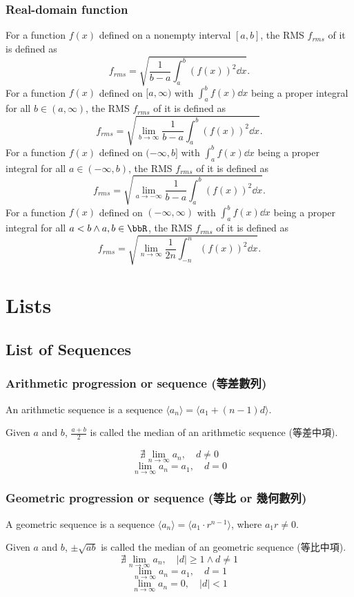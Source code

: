 \documentclass[a4paper,12pt]{report}
\begin{document}
\begin{itemize}
\begin{itemize}
\subsubsection{Real-domain function}
For a function $f(x)$ defined on a nonempty interval $[a,b]$, the RMS $f_{rms}$ of it is defined as
\[f_{rms}=\sqrt{\frac{1}{b-a}\int_a^b(f(x))^2\dd{x}}.\]
For a function $f(x)$ defined on $[a,\infty)$ with $\int_a^bf(x)\dd{x}$ being a proper integral for all $b\in(a,\infty)$, the RMS $f_{rms}$ of it is defined as
\[f_{rms}=\sqrt{\lim_{b\to\infty}\frac{1}{b-a}\int_a^b(f(x))^2\dd{x}}.\]
For a function $f(x)$ defined on $(-\infty,b]$ with $\int_a^bf(x)\dd{x}$ being a proper integral for all $a\in(-\infty,b)$, the RMS $f_{rms}$ of it is defined as
\[f_{rms}=\sqrt{\lim_{a\to-\infty}\frac{1}{b-a}\int_a^b(f(x))^2\dd{x}}.\]
For a function $f(x)$ defined on $(-\infty,\infty)$ with $\int_a^bf(x)\dd{x}$ being a proper integral for all $a<b\land a,b\in\bbR$, the RMS $f_{rms}$ of it is defined as
\[f_{rms}=\sqrt{\lim_{n\to\infty}\frac{1}{2n}\int_{-n}^n(f(x))^2\dd{x}}.\]



\section{Lists}
\subsection{List of Sequences}
\subsubsection{Arithmetic progression or sequence (等差數列)}
An arithmetic sequence is a sequence $\langle a_n\rangle=\langle a_1+(n-1)d\rangle$. 

Given $a$ and $b$, $\frac{a+b}{2}$ is called the median of an arithmetic sequence (等差中項).

\[\nexists\lim_{n\to\infty}a_n,\quad d\neq 0\]
\[\lim_{n\to\infty}a_n=a_1,\quad d=0\]
\subsubsection{Geometric progression or sequence (等比 or 幾何數列)}
A geometric sequence is a sequence $\langle a_n\rangle=\langle a_1\cdot r^{n-1}\rangle$, where $a_1r\neq 0$.

Given $a$ and $b$, $\pm\sqrt{ab}$ is called the median of an geometric sequence (等比中項).
\[\nexists\lim_{n\to\infty}a_n,\quad |d|\geq 1\land d\neq 1\]
\[\lim_{n\to\infty}a_n=a_1,\quad d=1\]
\[\lim_{n\to\infty}a_n=0,\quad |d|<1\]

\end{itemize}
\end{itemize}
\end{document}
